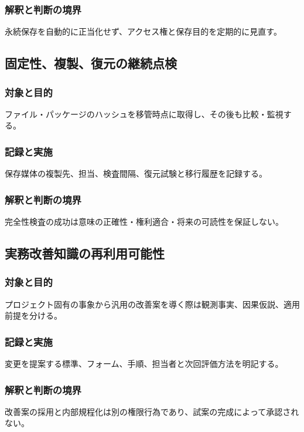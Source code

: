 \documentclass[a4paper,11pt]{article}
\begin{document}
\subsubsection{解釈と判断の境界}
\par 永続保存を自動的に正当化せず、アクセス権と保存目的を定期的に見直す。\par\medskip
\subsection{固定性、複製、復元の継続点検}
\subsubsection{対象と目的}
\par ファイル・パッケージのハッシュを移管時点に取得し、その後も比較・監視する。\par\medskip
\subsubsection{記録と実施}
\par 保存媒体の複製先、担当、検査間隔、復元試験と移行履歴を記録する。\par\medskip
\subsubsection{解釈と判断の境界}
\par 完全性検査の成功は意味の正確性・権利適合・将来の可読性を保証しない。\par\medskip
\subsection{実務改善知識の再利用可能性}
\subsubsection{対象と目的}
\par プロジェクト固有の事象から汎用の改善案を導く際は観測事実、因果仮説、適用前提を分ける。\par\medskip
\subsubsection{記録と実施}
\par 変更を提案する標準、フォーム、手順、担当者と次回評価方法を明記する。\par\medskip
\subsubsection{解釈と判断の境界}
\par 改善案の採用と内部規程化は別の権限行為であり、試案の完成によって承認されない。\par\medskip
\end{document}
